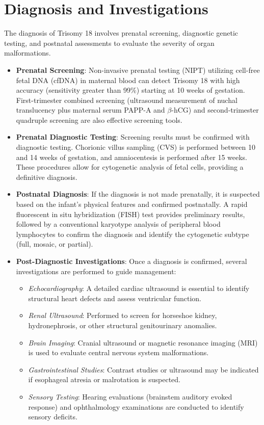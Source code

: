 \section*{Diagnosis and Investigations}
The diagnosis of Trisomy 18 involves prenatal screening, diagnostic genetic testing, and postnatal assessments to evaluate the severity of organ malformations.
\begin{itemize}
    \item \textbf{Prenatal Screening}: Non-invasive prenatal testing (NIPT) utilizing cell-free fetal DNA (cfDNA) in maternal blood can detect Trisomy 18 with high accuracy (sensitivity greater than 99\%) starting at 10 weeks of gestation. First-trimester combined screening (ultrasound measurement of nuchal translucency plus maternal serum PAPP-A and $\beta$-hCG) and second-trimester quadruple screening are also effective screening tools.
    \item \textbf{Prenatal Diagnostic Testing}: Screening results must be confirmed with diagnostic testing. Chorionic villus sampling (CVS) is performed between 10 and 14 weeks of gestation, and amniocentesis is performed after 15 weeks. These procedures allow for cytogenetic analysis of fetal cells, providing a definitive diagnosis.
    \item \textbf{Postnatal Diagnosis}: If the diagnosis is not made prenatally, it is suspected based on the infant's physical features and confirmed postnatally. A rapid fluorescent in situ hybridization (FISH) test provides preliminary results, followed by a conventional karyotype analysis of peripheral blood lymphocytes to confirm the diagnosis and identify the cytogenetic subtype (full, mosaic, or partial).
    \item \textbf{Post-Diagnostic Investigations}: Once a diagnosis is confirmed, several investigations are performed to guide management:
    \begin{itemize}
        \item \textit{Echocardiography}: A detailed cardiac ultrasound is essential to identify structural heart defects and assess ventricular function.
        \item \textit{Renal Ultrasound}: Performed to screen for horseshoe kidney, hydronephrosis, or other structural genitourinary anomalies.
        \item \textit{Brain Imaging}: Cranial ultrasound or magnetic resonance imaging (MRI) is used to evaluate central nervous system malformations.
        \item \textit{Gastrointestinal Studies}: Contrast studies or ultrasound may be indicated if esophageal atresia or malrotation is suspected.
        \item \textit{Sensory Testing}: Hearing evaluations (brainstem auditory evoked response) and ophthalmology examinations are conducted to identify sensory deficits.
    \end{itemize}
\end{itemize}

